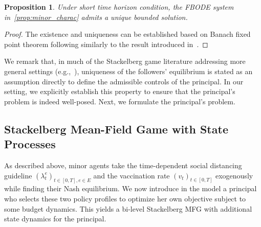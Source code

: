 \documentclass[letterpaper, 10 pt, conference]{ieeeconf}  %
\newtheorem{proposition}[theorem]{Proposition}
\begin{document}
\begin{proposition}
    \label{prop:minor_well_posedness}
    Under short time horizon condition, the FBODE system in~\ref{prop:minor_charac} admits a unique bounded solution.
\end{proposition}
\begin{proof}
    The existence and uniqueness can be established based on Banach fixed point theorem following similarly to the result introduced in~\cite{liu2025incorporatingauthorityperceptioneconomic}.
\end{proof}
We remark that, in much of the Stackelberg game literature addressing more general settings (e.g.,~\cite{Elie2018ATail,Bensoussan_2015,aurell2022optimal}), uniqueness of the followers' equilibrium is stated as an assumption directly to define the admissible controls of the principal. In our setting, we explicitly establish this property to ensure that the principal’s problem is indeed well-posed. Next, we formulate the principal's problem.

\subsection{Stackelberg Mean-Field Game with State Processes}
As described above, minor agents take the time-dependent social distancing guideline $(\lambda_t^e)_{t\in[0,T],e\in E}$ and the vaccination rate $(v_t)_{t\in[0,T]}$ exogenously while finding their Nash equilibrium. We now introduce in the model a principal who selects these two policy profiles to optimize her own objective subject to some budget dynamics. This yields a bi-level Stackelberg MFG with additional state dynamics for the principal.
\end{document}
